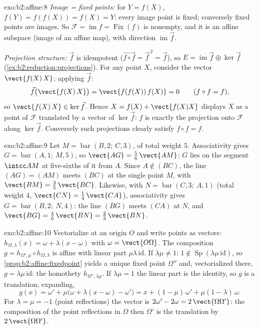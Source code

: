 \begin{solution}{exo:b2:affine:8}
\emph{Image = fixed points:} for $Y = f(X)$, $f(Y) = f(f(X)) =
f(X) = Y$: every image point is fixed; conversely fixed points are
images. So $\mathcal{F} = \operatorname{im} f =
\operatorname{Fix}(f)$ is nonempty, and it is an affine subspace
(image of an affine map), with direction $\operatorname{im}\vec f$.

\emph{Projection structure:} $\vec f$ is idempotent ($\vec{f\circ
f} = \vec f^{\,2} = \vec f$), so $E = \operatorname{im}\vec f
\oplus \ker \vec f$ (\cref{ex:b2:reduction:projections}). For any
point $X$, consider the vector $\vect{f(X)\,X}$; applying $\vec f$:
\[
\vec f\bigl(\vect{f(X)\,X}\bigr) = \vect{f(f(X))\,f(X)} = 0
\qquad (f \circ f = f),
\]
so $\vect{f(X)\,X} \in \ker\vec f$. Hence $X = f(X) +
\vect{f(X)X}$ displays $X$ as a point of $\mathcal{F}$ translated
by a vector of $\ker\vec f$: $f$ is exactly the projection onto
$\mathcal{F}$ along $\ker\vec f$. Conversely such projections
clearly satisfy $f \circ f = f$.
\end{solution}

\begin{solution}{exo:b2:affine:9}
Let $M = \operatorname{bar}(B, 2;\ C, 3)$, of total weight $5$.
Associativity gives $G = \operatorname{bar}(A, 1;\ M, 5)$, so
$\vect{AG} = \frac56\,\vect{AM}$: $G$ lies on the segment
$\intcc AM$ at five-sixths of it from $A$. Since $A \notin
(BC)$, the line $(AG) = (AM)$ meets $(BC)$ at the single point
$M$, with $\vect{BM} = \frac35\,\vect{BC}$. Likewise, with $N =
\operatorname{bar}(C, 3;\ A, 1)$ (total weight $4$, $\vect{CN}
= \frac14\,\vect{CA}$), associativity gives $G =
\operatorname{bar}(B, 2;\ N, 4)$: the line $(BG)$ meets $(CA)$
at $N$, and $\vect{BG} = \frac46\,\vect{BN} =
\frac23\,\vect{BN}$.
\end{solution}

\begin{solution}{exo:b2:affine:10}
Vectorialize at an origin $O$ and write points as vectors:
$h_{\Omega, \lambda}(x) = \omega + \lambda(x - \omega)$ with
$\omega = \vect{O\Omega}$. The composition $g = h_{\Omega',
\mu} \circ h_{\Omega, \lambda}$ is affine with linear part
$\mu\lambda\,\mathrm{id}$. If $\lambda\mu \neq 1$: $1 \notin
\operatorname{Sp}(\lambda\mu\,\mathrm{id})$, so
\cref{prop:b2:affine:fixedpoint} yields a unique fixed point
$\Omega''$ and, vectorialized there, $g =
\lambda\mu\,\mathrm{id}$: the homothety $h_{\Omega'',
\lambda\mu}$. If $\lambda\mu = 1$ the linear part is the
identity, so $g$ is a translation; expanding,
\[
g(x) = \omega' + \mu\bigl(\omega + \lambda(x - \omega) -
\omega'\bigr) = x + (1 - \mu)\,\omega' + \mu(1 -
\lambda)\,\omega .
\]
For $\lambda = \mu = -1$ (point reflections) the vector is
$2\omega' - 2\omega = 2\,\vect{\Omega\Omega'}$: the
composition of the point reflections in $\Omega$ then
$\Omega'$ is the translation by $2\,\vect{\Omega\Omega'}$.
\end{solution}

